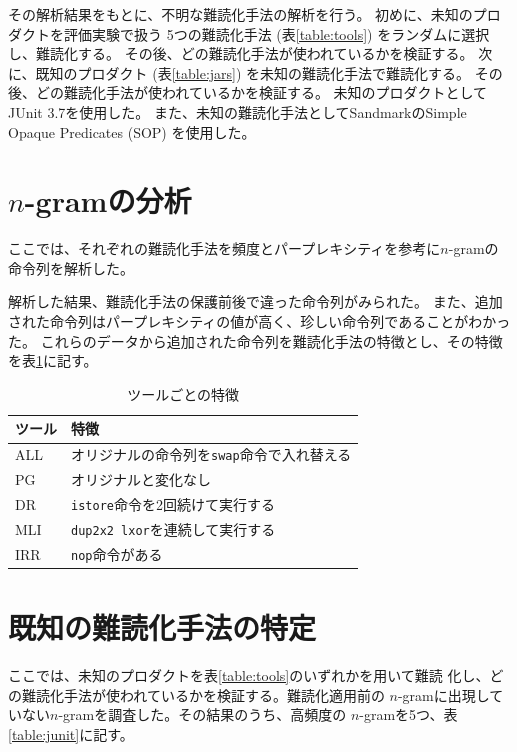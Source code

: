 \documentclass[12pt,twoside]{jreport}
\begin{document}
その解析結果をもとに、不明な難読化手法の解析を行う。
初めに、未知のプロダクトを評価実験で扱う
5つの難読化手法 (表\ref{table:tools}) をランダムに選択し、難読化する。
その後、どの難読化手法が使われているかを検証する。
次に、既知のプロダクト (表\ref{table:jars}) を未知の難読化手法で難読化する。
その後、どの難読化手法が使われているかを検証する。
未知のプロダクトとしてJUnit 3.7を使用した。
また、未知の難読化手法としてSandmarkのSimple Opaque Predicates (SOP) を使用した。

\section{$n$-gramの分析}

ここでは、それぞれの難読化手法を頻度とパープレキシティを参考に$n$-gramの命令列を解析した。

解析した結果、難読化手法の保護前後で違った命令列がみられた。
また、追加された命令列はパープレキシティの値が高く、珍しい命令列であることがわかった。
これらのデータから追加された命令列を難読化手法の特徴とし、その特徴を表\ref{table:features}に記す。

\begin{table}[t]
  \centering
  \footnotesize{
    \caption{ツールごとの特徴}\label{table:features}
  \begin{tabular}{l|l}
    ツール              & 特徴　\\ \hline
    ALL & オリジナルの命令列を\texttt{swap}命令で入れ替える \\
    PG  & オリジナルと変化なし \\
    DR  & \texttt{istore}命令を2回続けて実行する \\
    MLI & \texttt{dup2x2 lxor}を連続して実行する \\
    IRR & \texttt{nop}命令がある \\
  \end{tabular}}
\end{table}

\section{既知の難読化手法の特定}\label{sect:5gram_analysis}

ここでは、未知のプロダクトを表\ref{table:tools}のいずれかを用いて難読
化し、どの難読化手法が使われているかを検証する。難読化適用前の
$n$-gramに出現していない$n$-gramを調査した。その結果のうち、高頻度の
$n$-gramを5つ、表\ref{table:junit}に記す。
\end{document}
